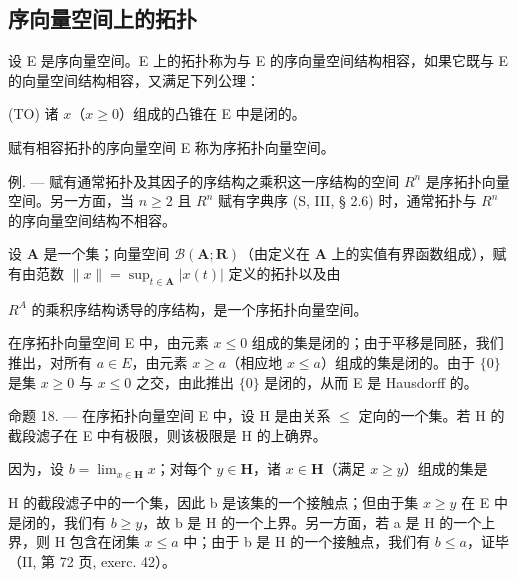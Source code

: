 \subsection{序向量空间上的拓扑}

设 E 是序向量空间。E 上的拓扑称为与 E 的序向量空间结构相容，如果它既与 E 的向量空间结构相容，又满足下列公理：

(TO) 诸 \(x\)（\(x \geqslant 0\)）组成的凸锥在 E 中是闭的。

赋有相容拓扑的序向量空间 E 称为序拓扑向量空间。

例. --- 赋有通常拓扑及其因子的序结构之乘积这一序结构的空间 \(R^{n}\) 是序拓扑向量空间。另一方面，当 \(n \geqslant 2\) 且 \(R^{n}\) 赋有字典序 (S, III, § 2.6) 时，通常拓扑与 \(R^{n}\) 的序向量空间结构不相容。

设 \(\mathbf{A}\) 是一个集；向量空间 \(\mathcal{B}(\mathbf{A};\mathbf{R})\)（由定义在 \(\mathbf{A}\) 上的实值有界函数组成），赋有由范数 \(\| x\| = \sup_{t\in \mathbf{A}}|x(t)|\) 定义的拓扑以及由

\(R^{A}\) 的乘积序结构诱导的序结构，是一个序拓扑向量空间。

在序拓扑向量空间 E 中，由元素 \(x \leqslant 0\) 组成的集是闭的；由于平移是同胚，我们推出，对所有 \(a \in E\)，由元素 \(x \geqslant a\)（相应地 \(x \leqslant a\)）组成的集是闭的。由于 \(\{0\}\) 是集 \(x \geqslant 0\) 与 \(x \leqslant 0\) 之交，由此推出 \(\{0\}\) 是闭的，从而 E 是 Hausdorff 的。

命题 18. --- 在序拓扑向量空间 E 中，设 H 是由关系 \(\leqslant\) 定向的一个集。若 H 的截段滤子在 E 中有极限，则该极限是 H 的上确界。

因为，设 \(b = \lim_{x\in \mathbf{H}}x\)；对每个 \(y\in \mathbf{H}\)，诸 \(x\in \mathbf{H}\)（满足 \(x\geqslant y\)）组成的集是

H 的截段滤子中的一个集，因此 b 是该集的一个接触点；但由于集 \(x \geqslant y\) 在 E 中是闭的，我们有 \(b \geqslant y\)，故 b 是 H 的一个上界。另一方面，若 a 是 H 的一个上界，则 H 包含在闭集 \(x \leqslant a\) 中；由于 b 是 H 的一个接触点，我们有 \(b \leqslant a\)，证毕（II, 第 72 页, exerc. 42）。

